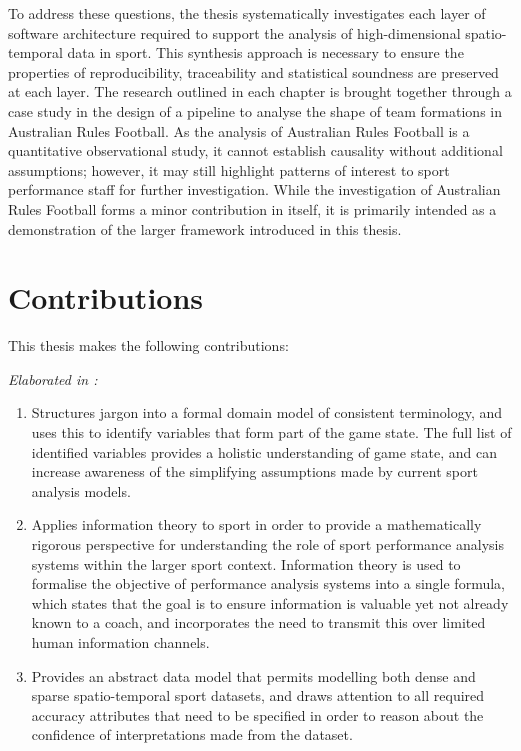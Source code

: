 To address these questions, the thesis systematically investigates each layer of software architecture required to support the analysis of high-dimensional spatio-temporal data in sport. This synthesis approach is necessary to ensure the properties of reproducibility, traceability and statistical soundness are preserved at each layer. The research outlined in each chapter is brought together through a case study in the design of a pipeline to analyse the shape of team formations in Australian Rules Football. As the analysis of Australian Rules Football is a quantitative observational study, it cannot establish causality without additional assumptions; however, it may still highlight patterns of interest to sport performance staff for further investigation. While the investigation of Australian Rules Football forms a minor contribution in itself, it is primarily intended as a demonstration of the larger framework introduced in this thesis.

\section{Contributions}

This thesis makes the following contributions:

\textit{Elaborated in :}
\begin{enumerate}
  \item Structures \arf{} jargon into a formal domain model of consistent terminology, and uses this to identify variables that form part of the game state. The full list of identified variables provides a holistic understanding of game state, and can increase awareness of the simplifying assumptions made by current sport analysis models.
  \item Applies information theory to sport in order to provide a mathematically rigorous perspective for understanding the role of sport performance analysis systems within the larger sport context. Information theory is used to formalise the objective of performance analysis systems into a single formula, which states that the goal is to ensure information is valuable yet not already known to a coach, and incorporates the need to transmit this over limited human information channels.
  \item Provides an abstract data model that permits modelling both dense and sparse spatio-temporal sport datasets, and draws attention to all required accuracy attributes that need to be specified in order to reason about the confidence of interpretations made from the dataset.
  \setcounter{contribnum}{\value{enumi}}
\end{enumerate}

